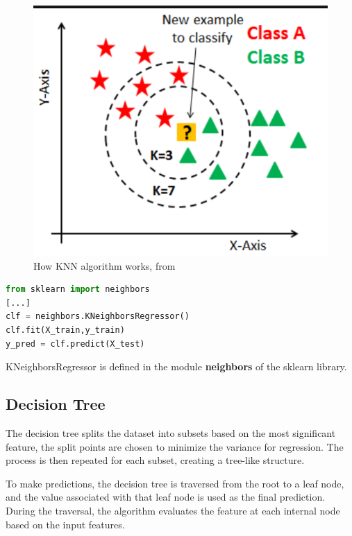 \begin{figure}
    \centering
    \includegraphics[scale=0.6]{res/ML/knn.png}
    \caption{How KNN algorithm works, from \cite{knn}}
\end{figure}

\begin{lstlisting}[language=Python, caption=K Nearest Neighbors implementation]
from sklearn import neighbors
[...]
clf = neighbors.KNeighborsRegressor()
clf.fit(X_train,y_train)
y_pred = clf.predict(X_test)
\end{lstlisting}

KNeighborsRegressor is defined in the module \textbf{neighbors} of the sklearn library.

\subsection{Decision Tree}
The decision tree splits the dataset into subsets based on the most significant feature, the split points are chosen to minimize the variance for regression. The process is then repeated for each subset, creating a tree-like structure.

To make predictions, the decision tree is traversed from the root to a leaf node, and the value associated with that leaf node is used as the final prediction. During the traversal, the algorithm evaluates the feature at each internal node based on the input features.

